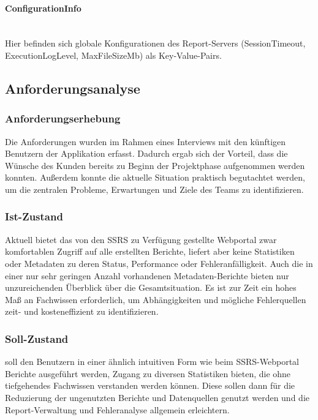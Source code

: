 \paragraph{ConfigurationInfo} ~\\
\label{p:ConfigurationInfo}
Hier befinden sich globale Konfigurationen des Report-Servers (SessionTimeout, ExecutionLogLevel, MaxFileSizeMb) als Key-Value-Pairs.


\subsection{Anforderungsanalyse}
\label{sec:Anforderungsanalyse}

\subsubsection{Anforderungserhebung}
\label{sec:Anforderungserhebung}
Die Anforderungen wurden im Rahmen eines Interviews mit den künftigen Benutzern der Applikation erfasst. Dadurch ergab sich der Vorteil, dass die Wünsche des Kunden bereits zu Beginn der Projektphase aufgenommen werden konnten. Außerdem konnte die aktuelle Situation praktisch begutachtet werden, um die zentralen Probleme, Erwartungen und Ziele des Teams \teamName zu identifizieren.

\subsubsection{Ist-Zustand}
\label{sec:Ist}
Aktuell bietet das von den \ac{SSRS} zu Verfügung gestellte Webportal zwar komfortablen Zugriff auf alle erstellten Berichte, liefert aber keine Statistiken oder Metadaten zu deren Status, Performance oder Fehleranfälligkeit. Auch die in einer nur sehr geringen Anzahl vorhandenen Metadaten-Berichte bieten nur unzureichenden Überblick über die Gesamtsituation. Es ist zur Zeit ein hohes Maß an Fachwissen erforderlich, um Abhängigkeiten und mögliche Fehlerquellen zeit- und kosteneffizient zu identifizieren.

\subsubsection{Soll-Zustand}
\label{sec:Soll}
\projektName soll den Benutzern in einer ähnlich intuitiven Form wie beim \ac{SSRS}-Webportal Berichte ausgeführt werden, Zugang zu diversen Statistiken bieten, die ohne tiefgehendes Fachwissen verstanden werden können. Diese sollen dann für die Reduzierung der ungenutzten Berichte und Datenquellen genutzt werden und die Report-Verwaltung und Fehleranalyse allgemein erleichtern.


